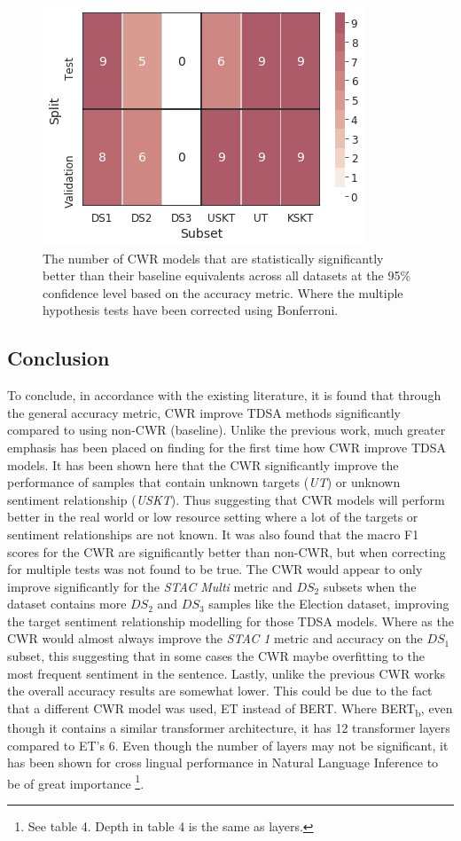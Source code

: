\begin{figure}[!h]
    \centering
    \includegraphics[scale=0.5]{images/augmentation/methods_performance/CWR/cwr_combined_sig_error_splits.png}
    \caption{The number of CWR models that are statistically significantly better than their baseline equivalents across all datasets at the 95\% confidence level based on the accuracy metric. Where the multiple hypothesis tests have been corrected using Bonferroni.}
    \label{fig:aug_cwr_combined_sig_error_splits}
\end{figure}

\subsection{Conclusion}
To conclude, in accordance with the existing literature, it is found that through the general accuracy metric, CWR improve TDSA methods significantly compared to using non-CWR (baseline). Unlike the previous work, much greater emphasis has been placed on finding for the first time how CWR improve TDSA models. It has been shown here that the CWR significantly improve the performance of samples that contain unknown targets (\textit{UT}) or unknown sentiment relationship (\textit{USKT}). Thus suggesting that CWR models will perform better in the real world or low resource setting where a lot of the targets or sentiment relationships are not known. It was also found that the macro F1 scores for the CWR are significantly better than non-CWR, but when correcting for multiple tests was not found to be true. The CWR would appear to only improve significantly for the \textit{STAC Multi} metric and $DS_2$ subsets when the dataset contains more $DS_2$ and $DS_3$ samples like the Election dataset, improving the target sentiment relationship modelling for those TDSA models. Where as the CWR would almost always improve the \textit{STAC 1} metric and accuracy on the $DS_1$ subset, this suggesting that in some cases the CWR maybe overfitting to the most frequent sentiment in the sentence. Lastly, unlike the previous CWR works the overall accuracy results are somewhat lower. This could be due to the fact that a different CWR model was used, ET instead of BERT. Where BERT\textsubscript{b}, even though it contains a similar transformer architecture, it has 12 transformer layers compared to ET's 6. Even though the number of layers may not be significant, it has been shown for cross lingual performance in Natural Language Inference to be of great importance \citep{wang2019cross} \footnote{See table 4. Depth in table 4 is the same as layers.}. 

